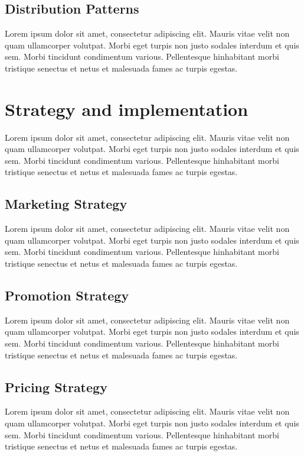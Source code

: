 \documentclass[11pt]{article}
\begin{document}
\subsection{Distribution Patterns}
Lorem ipsum dolor sit amet, consectetur adipiscing elit. Mauris vitae velit
non quam ullamcorper volutpat. Morbi eget turpis non justo sodales interdum
et quis sem. Morbi tincidunt condimentum various. Pellentesque hinhabitant morbi
tristique senectus et netus et malesuada fames ac turpis egestas.\newline
\pagebreak

\section{Strategy and implementation}
Lorem ipsum dolor sit amet, consectetur adipiscing elit. Mauris vitae velit
non quam ullamcorper volutpat. Morbi eget turpis non justo sodales interdum
et quis sem. Morbi tincidunt condimentum various. Pellentesque hinhabitant morbi
tristique senectus et netus et malesuada fames ac turpis egestas.\newline
\subsection{Marketing Strategy}
Lorem ipsum dolor sit amet, consectetur adipiscing elit. Mauris vitae velit
non quam ullamcorper volutpat. Morbi eget turpis non justo sodales interdum
et quis sem. Morbi tincidunt condimentum various. Pellentesque hinhabitant morbi
tristique senectus et netus et malesuada fames ac turpis egestas.\newline
\subsection{Promotion  Strategy}
Lorem ipsum dolor sit amet, consectetur adipiscing elit. Mauris vitae velit
non quam ullamcorper volutpat. Morbi eget turpis non justo sodales interdum
et quis sem. Morbi tincidunt condimentum various. Pellentesque hinhabitant morbi
tristique senectus et netus et malesuada fames ac turpis egestas.\newline
\subsection{Pricing Strategy}
Lorem ipsum dolor sit amet, consectetur adipiscing elit. Mauris vitae velit
non quam ullamcorper volutpat. Morbi eget turpis non justo sodales interdum
et quis sem. Morbi tincidunt condimentum various. Pellentesque hinhabitant morbi
tristique senectus et netus et malesuada fames ac turpis egestas.\newline
\end{document}
